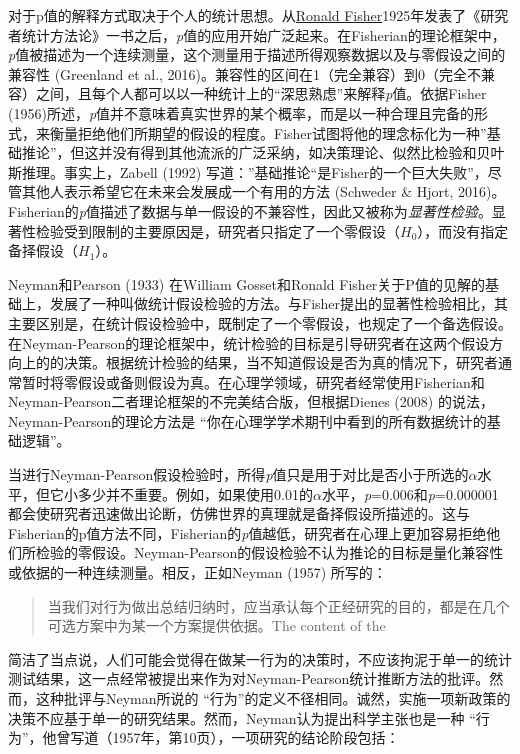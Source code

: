 \documentclass[
  letterpaper,
  DIV=11,
  numbers=noendperiod]{scrreprt}
\begin{document}
对于p值的解释方式取决于个人的统计思想。从\href{https://en.wikipedia.org/wiki/Ronald_Fisher}{Ronald
Fisher}1925年发表了《研究者统计方法论》一书之后，\emph{p}值的应用开始广泛起来。在Fisherian的理论框架中，\emph{p}值被描述为一个连续测量，这个测量用于描述所得观察数据以及与零假设之间的兼容性
(Greenland et al.,
2016)。兼容性的区间在1（完全兼容）到0（完全不兼容）之间，且每个人都可以以一种统计上的``深思熟虑''来解释\emph{p}值。依据Fisher
(1956)所述，\emph{p}值并不意味着真实世界的某个概率，而是以一种合理且完备的形式，来衡量拒绝他们所期望的假设的程度。Fisher试图将他的理念标化为一种''基础推论''，但这并没有得到其他流派的广泛采纳，如决策理论、似然比检验和贝叶斯推理。事实上，Zabell
(1992)
写道：''基础推论``是Fisher的一个巨大失败''，尽管其他人表示希望它在未来会发展成一个有用的方法
(Schweder \& Hjort,
2016)。Fisherian的\emph{p}值描述了数据与单一假设的不兼容性，因此又被称为\emph{显著性检验}。显著性检验受到限制的主要原因是，研究者只指定了一个零假设（\(H_0\)），而没有指定备择假设（\(H_1\)）。

Neyman和Pearson (1933) 在William Gosset和Ronald
Fisher关于P值的见解的基础上，发展了一种叫做统计假设检验的方法。与Fisher提出的显著性检验相比，其主要区别是，在统计假设检验中，既制定了一个零假设，也规定了一个备选假设。在Neyman-Pearson的理论框架中，统计检验的目标是引导研究者在这两个假设方向上的的决策。根据统计检验的结果，当不知道假设是否为真的情况下，研究者通常暂时将零假设或备则假设为真。在心理学领域，研究者经常使用Fisherian和Neyman-Pearson二者理论框架的不完美结合版，但根据Dienes
(2008) 的说法，Neyman-Pearson的理论方法是
``你在心理学学术期刊中看到的所有数据统计的基础逻辑''。

当进行Neyman-Pearson假设检验时，所得\emph{p}值只是用于对比是否小于所选的\(\alpha\)水平，但它小多少并不重要。例如，如果使用0.01的\(\alpha\)水平，\emph{p}=0.006和\emph{p}=0.000001都会使研究者迅速做出论断，仿佛世界的真理就是备择假设所描述的。这与Fisherian的p值方法不同，Fisherian的\emph{p}值越低，研究者在心理上更加容易拒绝他们所检验的零假设。Neyman-Pearson的假设检验不认为推论的目标是量化兼容性或依据的一种连续测量。相反，正如Neyman
(1957) 所写的：

\begin{quote}
当我们对行为做出总结归纳时，应当承认每个正经研究的目的，都是在几个可选方案中为某一个方案提供依据。The
content of the
\end{quote}

简洁了当点说，人们可能会觉得在做某一行为的决策时，不应该拘泥于单一的统计测试结果，这一点经常被提出来作为对Neyman-Pearson统计推断方法的批评。然而，这种批评与Neyman所说的
``行为''的定义不径相同。诚然，实施一项新政策的决策不应基于单一的研究结果。然而，Neyman认为提出科学主张也是一种
``行为''，他曾写道（1957年，第10页），一项研究的结论阶段包括：
\end{document}

